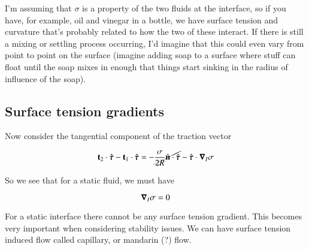 I'm assuming that $\sigma$ is a property of the two fluids at the interface, so if you have, for example, oil and vinegar in a bottle, we have surface tension and curvature that's probably related to how the two of these interact.  If there is still a mixing or settling process occurring, I'd imagine that this could even vary from point to point on the surface (imagine adding soap to a surface where stuff can float until the soap mixes in enough that things start sinking in the radius of influence of the soap).

\subsection{Surface tension gradients}

Now consider the tangential component of the traction vector

\begin{equation}\label{eqn:continuumL15:90}
\mathbf{t}_2 \cdot \hat{\boldsymbol{\tau}} - \mathbf{t}_1 \cdot \hat{\boldsymbol{\tau}} = - \cancel{ \frac{\sigma}{2 R} \hat{\mathbf{n}} \cdot \hat{\boldsymbol{\tau}}} - \hat{\boldsymbol{\tau}} \cdot \boldsymbol{\nabla}_I \sigma
\end{equation}

So we see that for a static fluid, we must have

\begin{equation}\label{eqn:continuumL15:110}
\boldsymbol{\nabla}_I \sigma = 0
\end{equation}

For a static interface there cannot be any surface tension gradient.  This becomes very important when considering stability issues.  We can have surface tension induced flow called capillary, or mandarin (?) flow.
